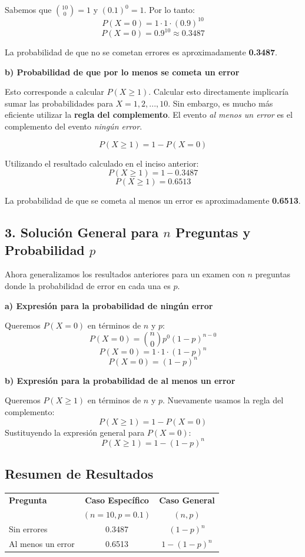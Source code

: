 \documentclass[a4paper]{article}
\begin{document}
Sabemos que $\binom{10}{0} = 1$ y $(0.1)^0 = 1$. Por lo tanto:
$$ P(X = 0) = 1 \cdot 1 \cdot (0.9)^{10} $$
$$ P(X = 0) = 0.9^{10} \approx 0.3487 $$

La probabilidad de que no se cometan errores es aproximadamente \textbf{0.3487}.

\textbf{b) Probabilidad de que por lo menos se cometa un error}

Esto corresponde a calcular $P(X \ge 1)$. Calcular esto directamente implicaría sumar las probabilidades para $X=1, 2, ..., 10$. Sin embargo, es mucho más eficiente utilizar la \textbf{regla del complemento}. El evento \textit{al menos un error} es el complemento del evento \textit{ningún error}.

$$ P(X \ge 1) = 1 - P(X = 0) $$

Utilizando el resultado calculado en el inciso anterior:
$$ P(X \ge 1) = 1 - 0.3487 $$
$$ P(X \ge 1) = 0.6513 $$

La probabilidad de que se cometa al menos un error es aproximadamente \textbf{0.6513}.

\subsection*{3. Solución General para $n$ Preguntas y Probabilidad $p$}

Ahora generalizamos los resultados anteriores para un examen con $n$ preguntas donde la probabilidad de error en cada una es $p$.

\textbf{a) Expresión para la probabilidad de ningún error}

Queremos $P(X = 0)$ en términos de $n$ y $p$:
$$ P(X = 0) = \binom{n}{0} p^0 (1-p)^{n-0} $$
$$ P(X = 0) = 1 \cdot 1 \cdot (1-p)^n $$
$$ P(X = 0) = (1-p)^n $$

\textbf{b) Expresión para la probabilidad de al menos un error}

Queremos $P(X \ge 1)$ en términos de $n$ y $p$. Nuevamente usamos la regla del complemento:
$$ P(X \ge 1) = 1 - P(X = 0) $$
Sustituyendo la expresión general para $P(X=0)$:
$$ P(X \ge 1) = 1 - (1-p)^n $$

\subsection*{Resumen de Resultados}

\begin{center}
\begin{tabular}{|l|c|c|}
\hline
\textbf{Pregunta} & \textbf{Caso Específico} & \textbf{Caso General} \\
 & $(n=10, p=0.1)$ & $(n, p)$ \\
\hline
Sin errores & 0.3487 & $(1-p)^n$ \\
\hline
Al menos un error & 0.6513 & $1 - (1-p)^n$ \\
\hline
\end{tabular}
\end{center}
\end{document}
